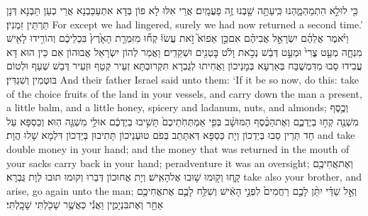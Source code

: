 {כִּ֖י לוּלֵ֣א הִתְמַהְמָ֑הְנוּ כִּֽי\maqqaf עַתָּ֥ה שַׁ֖בְנוּ זֶ֥ה פַעֲמָֽיִם׃}
{אֲרֵי אִלּוּ לָא פוֹן בְּדָא אִתְעַכַּבְנָא אֲרֵי כְעַן תַּבְנָא דְּנָן תַּרְתֵּין זִמְנִין׃}
{For except we had lingered, surely we had now returned a second time.’}{}
{וַיֹּ֨אמֶר אֲלֵהֶ֜ם יִשְׂרָאֵ֣ל אֲבִיהֶ֗ם אִם\maqqaf כֵּ֣ן \pasek  אֵפוֹא֮ זֹ֣את עֲשׂוּ֒ קְח֞וּ מִזִּמְרַ֤ת הָאָ֙רֶץ֙ בִּכְלֵיכֶ֔ם וְהוֹרִ֥ידוּ לָאִ֖ישׁ מִנְחָ֑ה מְעַ֤ט צֳרִי֙ וּמְעַ֣ט דְּבַ֔שׁ נְכֹ֣את וָלֹ֔ט בׇּטְנִ֖ים וּשְׁקֵדִֽים׃}
{וַאֲמַר לְהוֹן יִשְׂרָאֵל אֲבוּהוֹן אִם כֵּין הוּא דָּא עֲבִידוּ סַבוּ מִדִּמְשֻׁבַּח בְּאַרְעָא בְּמָנֵיכוֹן וַאֲחִיתוּ לְגֻבְרָא תִּקְרוּבְתָּא זְעֵיר קְטַף וּזְעֵיר דְּבַשׁ שְׁעַף וּלְטוֹם בּוּטְמִין וְשִׁגְדִּין׃}
{And their father Israel said unto them: ‘If it be so now, do this: take of the choice fruits of the land in your vessels, and carry down the man a present, a little balm, and a little honey, spicery and ladanum, nuts, and almonds;}{}
{וְכֶ֥סֶף מִשְׁנֶ֖ה קְח֣וּ בְיֶדְכֶ֑ם וְאֶת\maqqaf הַכֶּ֜סֶף הַמּוּשָׁ֨ב בְּפִ֤י אַמְתְּחֹֽתֵיכֶם֙ תָּשִׁ֣יבוּ בְיֶדְכֶ֔ם אוּלַ֥י מִשְׁגֶּ֖ה הֽוּא׃}
{וְכַסְפָּא עַל חַד תְּרֵין סַבוּ בְּיַדְכוֹן וְיָת כַּסְפָּא דְּאִתָּתַב בְּפֹם טוּעְנֵיכוֹן תָּתִיבוּן בְּיַדְכוֹן דִּלְמָא שָׁלוּ הֲוָת׃}
{and take double money in your hand; and the money that was returned in the mouth of your sacks carry back in your hand; peradventure it was an oversight;}{}
{וְאֶת\maqqaf אֲחִיכֶ֖ם קָ֑חוּ וְק֖וּמוּ שׁ֥וּבוּ אֶל\maqqaf הָאִֽישׁ׃}
{וְיָת אֲחוּכוֹן דְּבַרוּ וְקוּמוּ תּוּבוּ לְוָת גֻּבְרָא׃}
{take also your brother, and arise, go again unto the man;}{}
\newseder
{}%
{וְאֵ֣ל שַׁדַּ֗י יִתֵּ֨ן לָכֶ֤ם רַחֲמִים֙ לִפְנֵ֣י הָאִ֔ישׁ וְשִׁלַּ֥ח לָכֶ֛ם אֶת\maqqaf אֲחִיכֶ֥ם אַחֵ֖ר וְאֶת\maqqaf בִּנְיָמִ֑ין וַאֲנִ֕י כַּאֲשֶׁ֥ר שָׁכֹ֖לְתִּי שָׁכָֽלְתִּי׃}
